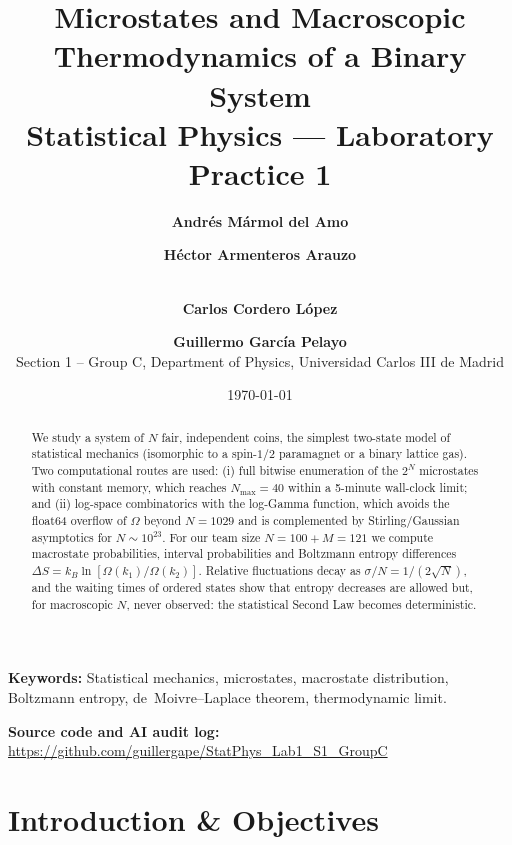 \documentclass[11pt,a4paper]{article}
\title{\textbf{Microstates and Macroscopic Thermodynamics of a Binary System}\\[0.5em]
\large Statistical Physics --- Laboratory Practice 1}
\author{\textbf{Andr\'es M\'armol del Amo} \and \textbf{H\'ector Armenteros Arauzo} \and \\
\textbf{Carlos Cordero L\'opez} \and \textbf{Guillermo Garc\'ia Pelayo}\\[0.6em]
\small Section 1 -- Group C, Department of Physics, Universidad Carlos III de Madrid}
\date{\today}
\begin{document}
\maketitle
\thispagestyle{empty}

\begin{abstract}
We study a system of $N$ fair, independent coins, the simplest two-state model of statistical mechanics (isomorphic to a spin-$1/2$ paramagnet or a binary lattice gas). Two computational routes are used: (i) full bitwise enumeration of the $2^N$ microstates with constant memory, which reaches $N_{\max}=40$ within a 5-minute wall-clock limit; and (ii) log-space combinatorics with the log-Gamma function, which avoids the float64 overflow of $\Omega$ beyond $N=1029$ and is complemented by Stirling/Gaussian asymptotics for $N\sim10^{23}$. For our team size $N=100+M=121$ we compute macrostate probabilities, interval probabilities and Boltzmann entropy differences $\Delta S=k_B\ln[\Omega(k_1)/\Omega(k_2)]$. Relative fluctuations decay as $\sigma/N=1/(2\sqrt N)$, and the waiting times of ordered states show that entropy decreases are allowed but, for macroscopic $N$, never observed: the statistical Second Law becomes deterministic.
\end{abstract}

\vspace{0.5em}
\noindent\textbf{Keywords:} Statistical mechanics, microstates, macrostate distribution, Boltzmann entropy, de~Moivre--Laplace theorem, thermodynamic limit.

\noindent\textbf{Source code and AI audit log:} \url{https://github.com/guillergape/StatPhys_Lab1_S1_GroupC}

\newpage
{}

\section{Introduction \& Objectives}
\label{sec:intro}
\end{document}
